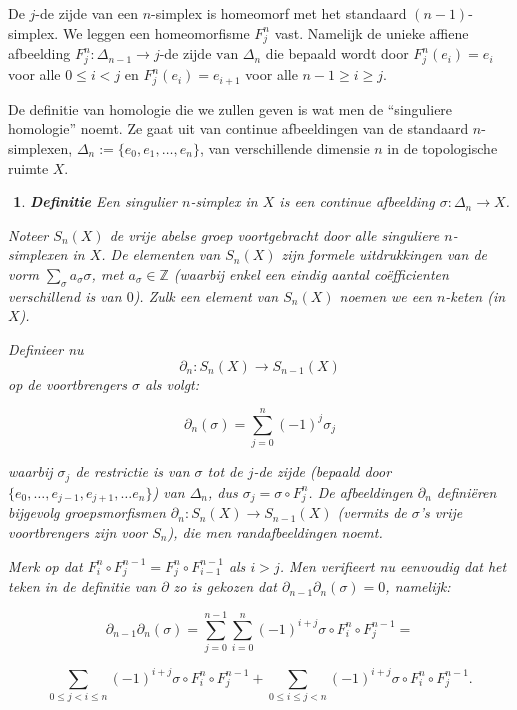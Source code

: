 \documentclass[12pt]{book}
\newtheorem{dfh}[stelh]{$\!\!$}
\newenvironment{df}{\begin{dfh} \em {\bf Definitie }}{\end{dfh}}
\begin{document}
De $j$-de zijde van een $n$-simplex is homeomorf met het standaard $(n-1)$-simplex. We leggen  een homeomorfisme $F_{j}^{n}$ vast. Namelijk de unieke affiene afbeelding $F_{j}^{n}: \Delta_{n-1} \to j\mbox{-de zijde van } \Delta_n$ die bepaald wordt door $F_{j}^{n}(e_i)=e_i$ voor alle $0\leq i<j$ en $F_{j}^{n}(e_i)=e_{i+1}$ voor alle $n-1\geq i\geq j$.



De definitie van  homologie die we zullen geven is wat men de ``singuliere homologie'' noemt. Ze gaat uit van continue
afbeeldingen van de standaard $n$-simplexen, $\Delta_{n}:=\{e_0,e_1, \ldots , e_n\}$, van verschillende dimensie
$n$ in de topologische ruimte $X$.

\begin{df} Een  {\em singulier $n$-simplex} in $X$ is een continue afbeelding $\sigma:\Delta_{n}\to
X$.

Noteer $S_n(X)$ de vrije abelse groep voortgebracht door alle singuliere $n$-simplexen in $X$. De
elementen van $S_n(X)$ zijn formele uitdrukkingen van de vorm $\sum_{\sigma}a_\sigma \sigma$, met
$a_\sigma \in \mathbb{Z}$ (waarbij enkel een eindig aantal co\"{e}fficienten verschillend is van $0$). Zulk een element van $S_{n}(X)$ noemen we
een $n$-{\em keten} (in $X$).

Definieer nu
$$\partial_{n}:S_{n}(X)\to S_{n-1}(X)$$
op de voortbrengers $\sigma$ als volgt:

$$\partial_{n}(\sigma)=\sum_{j=0}^{n}(-1)^{j}\sigma_{j}$$


waarbij $\sigma_{j}$ de restrictie is van $\sigma$ tot de $j$-de zijde (bepaald door $\{e_{0}, \ldots , e_{j-1}, e_{j+1}, \ldots e_n\}$) van $\Delta_n$, dus $\sigma_{j}=\sigma \circ F_{j}^{n}$. De afbeeldingen $\partial_{n}$ defini\"eren bijgevolg groepsmorfismen $\partial_{n}:S_{n}(X)\to S_{n-1}(X)$ (vermits de $\sigma$'s vrije voortbrengers zijn voor $S_n$), die men \emph{randafbeeldingen} noemt.

 Merk op dat $F_{i}^{n}\circ F_{j}^{n-1}=
F_{j}^{n}\circ F_{i-1}^{n-1}$ als $i>j$. Men verifieert nu eenvoudig dat het teken in de definitie van $\partial$ zo is gekozen dat $\partial_{n-1}\partial_{n}(\sigma)=0$, namelijk:

$$\partial_{n-1}\partial_{n}(\sigma)=\sum_{j=0}^{n-1}\sum_{i=0}^{n} (-1)^{i+j} \sigma \circ F_{i}^{n}\circ F_{j}^{n-1}=$$

$$\sum_{0\leq j<i\leq n} (-1)^{i+j} \sigma \circ F_{i}^{n} \circ F_{j}^{n-1}+ \sum_{0\leq i\leq j < n} (-1)^{i+j} \sigma \circ F_{i}^{n} \circ F_{j}^{n-1}.$$


\end{df}
\end{document}
